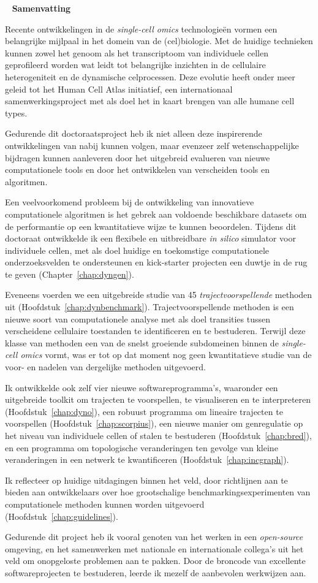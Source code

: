 \newpage
\ 
\vfill
{\bfseries\LARGE Samenvatting}
\vfill

{
\fontsize{9}{10}\selectfont
Recente ontwikkelingen in de \textit{single-cell omics} technologieën vormen een belangrijke mijlpaal in het domein van de (cel)biologie. Met de huidige technieken kunnen zowel het genoom als het transcriptoom van individuele cellen geprofileerd worden wat leidt tot belangrijke inzichten in de cellulaire heterogeniteit en de dynamische celprocessen. Deze evolutie heeft onder meer geleid tot het Human Cell Atlas initiatief, een internationaal samenwerkingsproject met als doel het in kaart brengen van alle humane cell types.

Gedurende dit doctoraatsproject heb ik niet alleen deze inspirerende ontwikkelingen van nabij kunnen volgen, maar evenzeer zelf wetenschappelijke bijdragen kunnen aanleveren door het uitgebreid evalueren van nieuwe computationele tools en door het ontwikkelen van verscheiden tools en algoritmen.

Een veelvoorkomend probleem bij de ontwikkeling van innovatieve computationele algoritmen is het gebrek aan voldoende beschikbare datasets om de performantie op een kwantitatieve wijze te kunnen beoordelen. Tijdens dit doctoraat ontwikkelde ik een flexibele en uitbreidbare \textit{in silico} simulator voor individuele cellen, met als doel huidige en toekomstige computationele onderzoeksvelden te ondersteunen en kick-starter projecten een duwtje in de rug te geven (Chapter~\ref{chap:dyngen}). 

Eveneens voerden we een uitgebreide studie van 45 \textit{trajectvoorspellende} methoden uit (Hoofdstuk~\ref{chap:dynbenchmark}). Trajectvoorspellende methoden is een nieuwe soort van computationele analyse met als doel transities tussen verscheidene cellulaire toestanden te identificeren en te bestuderen. Terwijl deze klasse van methoden een van de snelst groeiende subdomeinen binnen de \textit{single-cell omics} vormt, was er tot op dat moment nog geen kwantitatieve studie van de voor- en nadelen van dergelijke methoden uitgevoerd.

Ik ontwikkelde ook zelf vier nieuwe softwareprogramma's, waaronder een uitgebreide toolkit om trajecten te voorspellen, te visualiseren en te interpreteren (Hoofdstuk~\ref{chap:dyno}), een robuust programma om lineaire trajecten te voorspellen (Hoofdstuk~\ref{chap:scorpius}), een nieuwe manier om genregulatie op het niveau van individuele cellen of stalen te bestuderen (Hoofdstuk~\ref{chap:bred}), en een programma om topologische veranderingen ten gevolge van kleine veranderingen in een netwerk te kwantificeren (Hoofdstuk~\ref{chap:incgraph}). 

Ik reflecteer op huidige uitdagingen binnen het veld, door richtlijnen aan te bieden aan ontwikkelaars over hoe grootschalige benchmarkingsexperimenten van computationele methoden kunnen worden uitgevoerd (Hoofdstuk~\ref{chap:guidelines}).

Gedurende dit project heb ik vooral genoten van het werken in een \textit{open-source} omgeving, en het samenwerken met nationale en internationale collega’s uit het veld om onopgeloste problemen aan te pakken.  Door de broncode van excellente softwareprojecten te bestuderen, leerde ik mezelf de aanbevolen werkwijzen aan.
\vfill
}